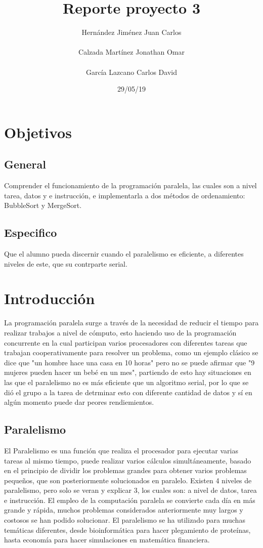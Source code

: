 \documentclass[11pt,letterpaper]{report}
\author{Hernández Jiménez Juan Carlos \\\\ Calzada Martínez Jonathan Omar\\\\García Lazcano Carlos David\\}
\title{Reporte proyecto 3}
\date {29/05/19}
\begin{document}
\maketitle 
\newpage

\section*{Objetivos}
\subsection*{General}
Comprender el funcionamiento de la programaci\' on paralela, las cuales son a nivel tarea, datos y e instrucci\' on, e implementarla a dos métodos de ordenamiento: BubbleSort y MergeSort. 


\subsection*{Especifico}
Que el alumno pueda discernir cuando el paralelismo es eficiente, a diferentes niveles de este, que su contrparte serial.
\section*{Introducci\' on}
La programaci\' on paralela surge a través de la necesidad de reducir el tiempo para realizar trabajos a nivel de c\' omputo, esto haciendo uso de la programaci\' on 
concurrente en la cual participan varios procesadores con diferentes tareas que trabajan cooperativamente para resolver un problema, como un ejemplo clásico se dice que "un hombre hace una casa en 10 horas"
pero no se puede afirmar que "9 mujeres pueden hacer un bebé en un mes", partiendo de esto hay situaciones en las que el paralelismo no es más eficiente que un algoritmo serial, por lo que se di\' o el grupo a la tarea de detrminar 
esto con diferente cantidad de datos y sí en algún momento puede dar peores rendiemientos.

\subsection*{Paralelismo}
El Paralelismo es una funci\' on que realiza el procesador para ejecutar varias tareas al mismo tiempo, puede realizar varios cálculos simultáneamente, basado en el principio de dividir los problemas grandes para obtener varios problemas pequeños, que son posteriormente solucionados en paralelo.
Existen 4 niveles de paralelismo, pero solo se veran y explicar 3, los cuales son: a nivel de datos, tarea e instrucci\' on.
El empleo de la computaci\' on paralela se convierte cada día en más grande y rápida, muchos problemas considerados anteriormente muy largos y costosos se han podido solucionar.
El paralelismo se ha utilizado para muchas temáticas diferentes, desde bioinformática para hacer plegamiento de proteínas, hasta economía para hacer simulaciones en matemática financiera.
\end{document}
